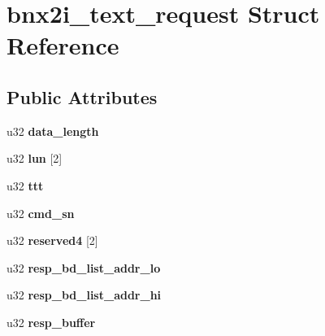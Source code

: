 \hypertarget{structbnx2i__text__request}{
\section{bnx2i\_\-text\_\-request Struct Reference}
\label{structbnx2i__text__request}
}
\subsection*{Public Attributes}
\begin{DoxyCompactItemize}
\item 
\hypertarget{structbnx2i__text__request_af90aa02afb046c2aada28d09a0057270}{
u32 {\bfseries data\_\-length}}
\label{structbnx2i__text__request_af90aa02afb046c2aada28d09a0057270}

\item 
\hypertarget{structbnx2i__text__request_a20b1d9d1ba8bd89128466826e018309c}{
u32 {\bfseries lun} \mbox{[}2\mbox{]}}
\label{structbnx2i__text__request_a20b1d9d1ba8bd89128466826e018309c}

\item 
\hypertarget{structbnx2i__text__request_a1d60cd9de3779408866a403ef438dbb8}{
u32 {\bfseries ttt}}
\label{structbnx2i__text__request_a1d60cd9de3779408866a403ef438dbb8}

\item 
\hypertarget{structbnx2i__text__request_ac6abb23a440f11e3ddca790e8ea42ec9}{
u32 {\bfseries cmd\_\-sn}}
\label{structbnx2i__text__request_ac6abb23a440f11e3ddca790e8ea42ec9}

\item 
\hypertarget{structbnx2i__text__request_a250e76fbb849c2ed967cd055b0ec6396}{
u32 {\bfseries reserved4} \mbox{[}2\mbox{]}}
\label{structbnx2i__text__request_a250e76fbb849c2ed967cd055b0ec6396}

\item 
\hypertarget{structbnx2i__text__request_a737ec438201a059b33f8ddd880f16f9a}{
u32 {\bfseries resp\_\-bd\_\-list\_\-addr\_\-lo}}
\label{structbnx2i__text__request_a737ec438201a059b33f8ddd880f16f9a}

\item 
\hypertarget{structbnx2i__text__request_a024cd332c0b5b5a9218b9b6ac6d9dc91}{
u32 {\bfseries resp\_\-bd\_\-list\_\-addr\_\-hi}}
\label{structbnx2i__text__request_a024cd332c0b5b5a9218b9b6ac6d9dc91}

\item 
\hypertarget{structbnx2i__text__request_a005e17a86f615f7beba9dfe337c35dd6}{
u32 {\bfseries resp\_\-buffer}}
\label{structbnx2i__text__request_a005e17a86f615f7beba9dfe337c35dd6}


\end{DoxyCompactItemize}
